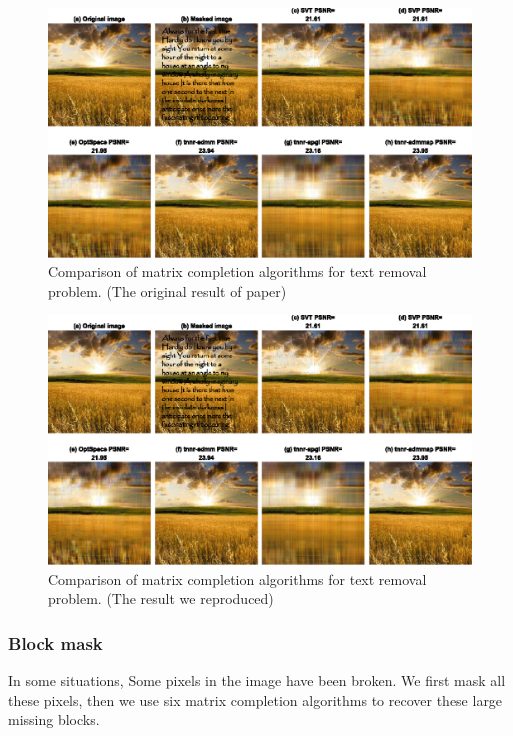 \documentclass{article}
\begin{document}
{\begin{figure}[ht]
    \centering
    \includegraphics[]{./assets/fig8.eps}
    \caption{Comparison of matrix completion algorithms for text removal problem. (The original result of paper)\label{fig8ori}}
\end{figure}
\begin{figure}[ht]
    \centering
    \includegraphics[]{./assets/fig8.eps}
    \caption{Comparison of matrix completion algorithms for text removal problem. (The result we reproduced)\label{fig8}}
\end{figure}


\subsubsection{Block mask}
In some situations, Some pixels in the image have been broken. We first mask all these pixels, then we use six matrix completion algorithms to recover these large missing blocks.


}
\end{document}
